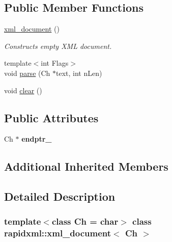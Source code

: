 \subsection*{Public Member Functions}
\begin{DoxyCompactItemize}
\item 
\mbox{\label{classrapidxml_1_1xml__document_aae8841b15085ba8f32ff46587ace28f5}} 
\hyperlink{classrapidxml_1_1xml__document_aae8841b15085ba8f32ff46587ace28f5}{xml\+\_\+document} ()
\begin{DoxyCompactList}\small\item\em Constructs empty X\+ML document. \end{DoxyCompactList}\item 
{\footnotesize template$<$int Flags$>$ }\\void \hyperlink{classrapidxml_1_1xml__document_a9376748d5782a60bbe17307ac96f2e93}{parse} (Ch $\ast$text, int n\+Len)
\item 
void \hyperlink{classrapidxml_1_1xml__document_a826929ff54242532198701f19ff5f83f}{clear} ()
\end{DoxyCompactItemize}
\subsection*{Public Attributes}
\begin{DoxyCompactItemize}
\item 
\mbox{\label{classrapidxml_1_1xml__document_aafb22c0e35781c56fca722af429d40ff}} 
Ch $\ast$ {\bfseries endptr\+\_\+}
\end{DoxyCompactItemize}
\subsection*{Additional Inherited Members}


\subsection{Detailed Description}
\subsubsection*{template$<$class Ch = char$>$\newline
class rapidxml\+::xml\+\_\+document$<$ Ch $>$}


